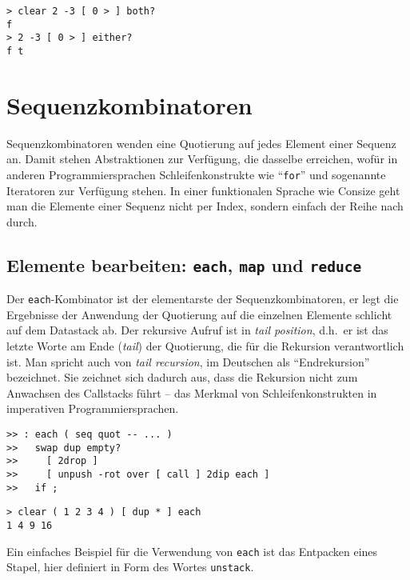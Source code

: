\begin{verbatim}
> clear 2 -3 [ 0 > ] both?
f
> 2 -3 [ 0 > ] either?
f t
\end{verbatim}

\section{Sequenzkombinatoren}
\label{Sec:SequenceCombinators}

Sequenzkombinatoren wenden eine Quotierung auf jedes Element einer Sequenz an. Damit stehen Abstraktionen zur Verfügung, die dasselbe erreichen, wofür in anderen Programmiersprachen Schleifenkonstrukte wie "`\verb|for|"' und sogenannte Iteratoren zur Verfügung stehen. In einer funktionalen Sprache wie Consize geht man die Elemente einer Sequenz nicht per Index, sondern einfach der Reihe nach durch.

\subsection{Elemente bearbeiten: \texttt{each}, \texttt{map} und \texttt{reduce}}

Der \verb|each|-Kombinator ist der elementarste der Sequenzkombinatoren, er legt die Ergebnisse der Anwendung der Quotierung auf die einzelnen Elemente schlicht auf dem Datastack ab. Der rekursive Aufruf ist in \emph{tail position}, d.h.\ er ist das letzte Worte am Ende (\emph{tail}) der Quotierung, die für die Rekursion verantwortlich ist. Man spricht auch von \emph{tail recursion}, im Deutschen als "`Endrekursion"' bezeichnet. Sie zeichnet sich dadurch aus, dass die Rekursion nicht zum Anwachsen des Callstacks führt -- das Merkmal von Schleifenkonstrukten in imperativen Programmiersprachen.

\begin{verbatim}
>> : each ( seq quot -- ... )
>>   swap dup empty?
>>     [ 2drop ]
>>     [ unpush -rot over [ call ] 2dip each ]
>>   if ;
\end{verbatim}

\begin{verbatim}
> clear ( 1 2 3 4 ) [ dup * ] each
1 4 9 16
\end{verbatim}

Ein einfaches Beispiel für die Verwendung von \verb|each| ist das Entpacken eines Stapel, hier definiert in Form des Wortes \verb|unstack|.

